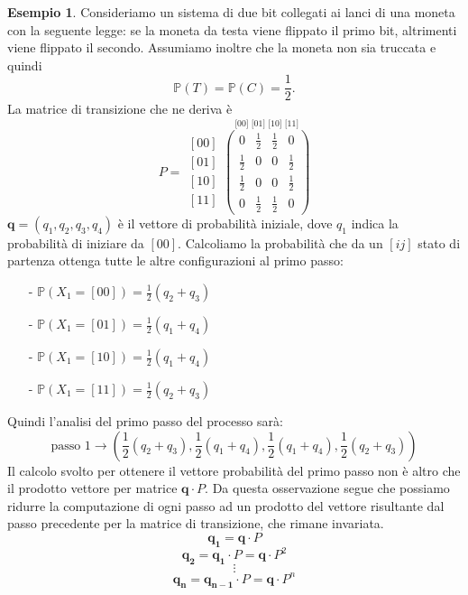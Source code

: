 \documentclass{article}
\theoremstyle{definition}
\theoremstyle{definition}
\newtheorem{example}[theorem]{Esempio}
\theoremstyle{remark}
\begin{document}
\begin{example}
    Consideriamo un sistema di due bit collegati ai lanci di una moneta con la seguente legge:
    se la moneta da testa viene flippato il primo bit, altrimenti viene flippato il secondo. Assumiamo
    inoltre che la moneta non sia truccata e quindi
    $$\mathbb{P}(T)= \mathbb{P}(C) = \frac{1}{2}.$$
    La matrice di transizione che ne deriva è
    $$P = \begin{matrix}
            [00] \\
            [01] \\
            [10] \\
            [11]
        \end{matrix}\overset{\text{[00] [01] [10] [11]}}
        {\begin{pmatrix}
                0           & \frac{1}{2} & \frac{1}{2} & 0           \\
                \frac{1}{2} & 0           & 0           & \frac{1}{2} \\
                \frac{1}{2} & 0           & 0           & \frac{1}{2} \\
                0           & \frac{1}{2} & \frac{1}{2} & 0
            \end{pmatrix}}$$
    $\boldsymbol{q}=(q_1,q_2,q_3,q_4)$ è il vettore di probabilità iniziale, dove $q_1$ indica la probabilità di iniziare da $[00]$.
    Calcoliamo la probabilità che da un $[ij]$ stato di partenza ottenga tutte le altre configurazioni al primo passo:
    \begin{itemize}
        \item [-]$\mathbb{P}(X_1=[00]) = \frac{1}{2}(q_2+q_3)$
        \item [-]$\mathbb{P}(X_1=[01]) = \frac{1}{2}(q_1+q_4)$
        \item [-]$\mathbb{P}(X_1=[10]) = \frac{1}{2}(q_1+q_4)$
        \item [-]$\mathbb{P}(X_1=[11]) = \frac{1}{2}(q_2+q_3)$
    \end{itemize}
    Quindi l'analisi del primo passo del processo sarà:
    $$\text{passo 1} \to(\frac{1}{2}(q_2+q_3),\frac{1}{2}(q_1+q_4),\frac{1}{2}(q_1+q_4),\frac{1}{2}(q_2+q_3))$$
    Il calcolo svolto per ottenere il vettore probabilità del primo passo non è altro che il prodotto vettore per matrice
    $\boldsymbol{q} \cdot P$. Da questa osservazione segue che possiamo ridurre la computazione di ogni passo ad un prodotto del vettore
    risultante dal passo precedente per la matrice di transizione, che rimane invariata.
    $$\boldsymbol{q_1} = \boldsymbol{q}\cdot P$$
    $$\boldsymbol{q_2} =\boldsymbol{q_1}\cdot P= \boldsymbol{q}\cdot P^2$$
    $$\vdots$$
    $$\boldsymbol{q_n} = \boldsymbol{q_{n-1}}\cdot P = \boldsymbol{q}\cdot P^n$$
\end{example}
\end{document}
